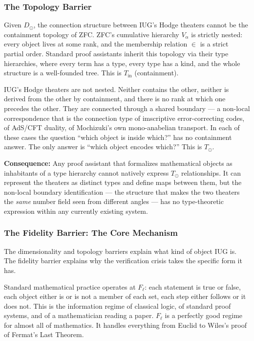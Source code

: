 \documentclass[10pt,a4paper]{article}
\begin{document}
\subsubsection{The Topology Barrier}

Given $D_\odot$, the connection structure between IUG's Hodge theaters cannot be the containment
topology of ZFC.
ZFC's cumulative hierarchy $V_\alpha$ is strictly nested: every object lives at some rank,
and the membership relation $\in$ is a strict partial order.
Standard proof assistants inherit this topology via their type hierarchies, where every term
has a type, every type has a kind, and the whole structure is a well-founded tree.
This is $T_\text{in}$ (containment).

IUG's Hodge theaters are not nested.
Neither contains the other, neither is derived from the other by containment,
and there is no rank at which one precedes the other.
They are connected through a shared boundary --- a non-local correspondence that is the
connection type of imscriptive error-correcting codes, of AdS/CFT duality,
of Mochizuki's own mono-anabelian transport.
In each of these cases the question ``which object is inside which?'' has no containment answer.
The only answer is ``which object encodes which?''
This is $T_\odot$.

\textbf{Consequence:} Any proof assistant that formalizes mathematical objects as inhabitants of
a type hierarchy cannot natively express $T_\odot$ relationships.
It can represent the theaters as distinct types and define maps between them,
but the non-local boundary identification --- the structure that makes the two theaters the
\emph{same} number field seen from different angles --- has no type-theoretic expression
within any currently existing system.

\subsubsection{The Fidelity Barrier: The Core Mechanism}

The dimensionality and topology barriers explain what kind of object IUG is.
The fidelity barrier explains why the verification crisis takes the specific form it has.

Standard mathematical practice operates at $F_{\ell}$: each statement is true or false,
each object either is or is not a member of each set, each step either follows or it does not.
This is the information regime of classical logic, of standard proof systems, and of a
mathematician reading a paper.
$F_{\ell}$ is a perfectly good regime for almost all of mathematics.
It handles everything from Euclid to Wiles's proof of Fermat's Last Theorem.
\end{document}

